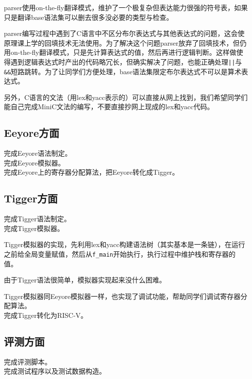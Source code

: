 \documentclass[a4paper]{ctexart}
\begin{document}
parser使用on-the-f\/ly翻译模式，维护了一个极复杂但表达能力很强的符号表，如果只是翻译base语法集可以删去很多没必要的类型与检查。

parser编写过程中遇到了C语言中不区分布尔表达式与其他表达式的问题，这会使原理课上学的回填技术无法使用。为了解决这个问题parser放弃了回填技术，但仍用on-the-f\/ly翻译模式，只是先计算表达式的值，然后再进行逻辑判断。这样做使得遇到逻辑表达式时产出的代码略冗长，但确实解决了问题，也能正确处理\texttt{||}与\texttt{\&\&}短路跳转。为了让同学们方便处理，base语法集限定布尔表达式不可以是算术表达式。

另外，C语言的文法（用lex和yacc表示的）可以直接从网上找到，我们希望同学们能自己完成MiniC文法的编写，不要直接抄网上现成的lex和yacc代码。

\subsection{Eeyore方面}

\noindent 完成Eeyore语法制定。
\\

\noindent 完成Eeyore模拟器。
\\

\noindent 完成Eeyore上的寄存器分配算法，把Eeyore转化成Tigger。

\subsection{Tigger方面}

\noindent 完成Tigger语法制定。
\\

\noindent 完成Tigger模拟器。

Tigger模拟器的实现，先利用lex和yacc构建语法树（其实基本是一条链），在运行之前给全局变量赋值，然后从\texttt{f\_main}开始执行，执行过程中维护栈和寄存器的值。

由于Tigger语法很简单，模拟器实现起来没什么困难。

Tigger模拟器同Eeyore模拟器一样，也实现了调试功能，帮助同学们调试寄存器分配算法。
\\

\noindent 完成Tigger转化为RISC-V。

\subsection{评测方面}

\noindent 完成评测脚本。
\\

\noindent 完成测试程序以及测试数据构造。
\end{document}
